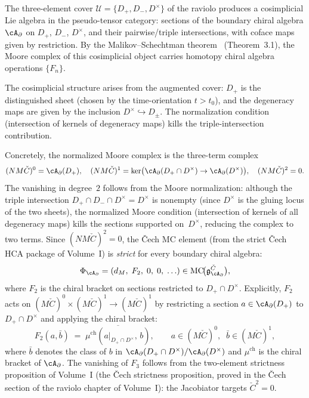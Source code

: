 \begin{remark}
\label{rmk:hca-raviolo-cech}
The three-element cover $\mathcal{U} = \{D_+, D_-, D^\times\}$
of the raviolo produces a cosimplicial Lie algebra in the
pseudo-tensor category: sections of the boundary chiral algebra
$\cA_\partial$ on $D_+$, $D_-$, $D^\times$, and their
pairwise/triple intersections, with coface maps given by
restriction. By the Malikov--Schechtman theorem~\cite{MS24}
(Theorem~3.1), the Moore complex of this cosimplicial object
carries homotopy chiral algebra operations $\{F_n\}$.

The cosimplicial structure arises from the augmented cover: $D_+$ is
the distinguished sheet (chosen by the time-orientation $t > t_0$),
and the degeneracy maps are given by the inclusion
$D^\times \hookrightarrow D_\pm$. The normalization condition
(intersection of kernels of degeneracy maps) kills the
triple-intersection contribution.

Concretely, the normalized Moore complex is the three-term complex
\[
(NM\check{C})^0 = \cA_\partial(D_+),
\quad
(NM\check{C})^1
 = \ker\bigl(\cA_\partial(D_+ \cap D^\times) \to \cA_\partial(D^\times)\bigr),
\quad
(NM\check{C})^2 = 0.
\]
The vanishing in degree~$2$ follows from the Moore normalization: although the
triple intersection $D_+ \cap D_- \cap D^\times = D^\times$ is nonempty
(since $D^\times$ is the gluing locus of the two sheets),
the normalized Moore condition (intersection of kernels of all
degeneracy maps) kills the sections supported on~$D^\times$, reducing
the complex to two terms. Since $(NM\check{C})^2 = 0$, the \v{C}ech MC element
(from the strict \v{C}ech HCA package of Volume~I) is \emph{strict} for
every boundary chiral algebra:
\[
\Phi_{\cA_\partial}
= (d_M,\; F_2,\; 0,\; 0,\; \ldots)
\in \operatorname{MC}\!\bigl(\mathfrak{g}^{\check{C}}_{\cA_\partial}\bigr),
\]
where $F_2$ is the chiral bracket on sections restricted to
$D_+ \cap D^\times$. Explicitly, $F_2$ acts on
$(M\check{C})^0 \times (M\check{C})^1 \to (M\check{C})^1$ by
restricting a section $a \in \cA_\partial(D_+)$ to
$D_+ \cap D^\times$ and applying the chiral bracket:
\[
F_2(a, \bar{b})
 \;=\; \overline{\mu^{\mathrm{ch}}(a|_{D_+ \cap D^\times},\, b)},
\qquad
a \in (M\check{C})^0,\;\;
\bar{b} \in (M\check{C})^1,
\]
where $\bar{b}$ denotes the class of $b$ in
$\cA_\partial(D_+ \cap D^\times)/\cA_\partial(D^\times)$ and
$\mu^{\mathrm{ch}}$ is the chiral bracket of $\cA_\partial$.
The vanishing of $F_3$ follows from
the two-element strictness proposition of Volume~I
(the \v{C}ech strictness proposition, proved in the \v{C}ech section
of the raviolo chapter of Volume~I): the
Jacobiator targets $\check{C}^2 = 0$.


\end{remark}
